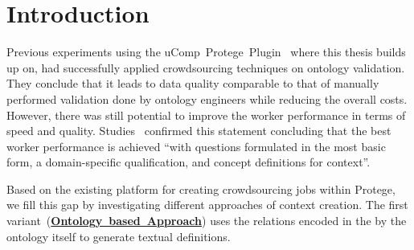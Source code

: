 \section{Introduction}\label{sec:approaches_introduction}
Previous experiments using the uComp~Protege~Plugin~\cite{wohlgenannt2016} where this thesis builds up on, had successfully applied crowdsourcing techniques on ontology validation. They conclude that it leads to data quality comparable to that of manually performed validation done by ontology engineers while reducing the overall costs. However, there was still potential to improve the worker performance in terms of speed and quality. 
Studies~\cite{mortensen2013} confirmed this statement concluding that the best worker performance is achieved
\enquote{with questions formulated in the most basic form, a domain-specific qualification, and concept definitions for context}.

Based on the existing platform for creating crowdsourcing jobs within Protege, we fill this gap by investigating different approaches of context creation.
The first variant~(\hyperref[sec:enrichment_ontology_approach]{\textbf{Ontology~based~Approach}}) uses the relations encoded in the by the ontology itself to generate textual definitions. 